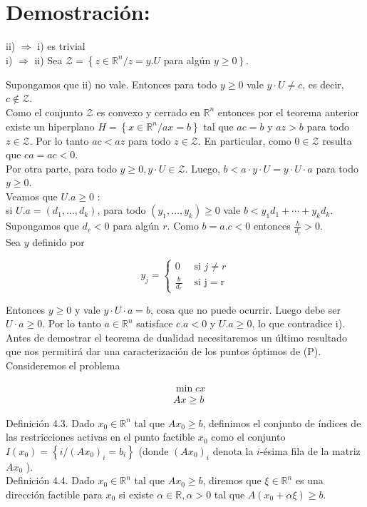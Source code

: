 \documentclass[10pt]{article}
\begin{document}
\section*{Demostración:}
ii) $\Longrightarrow$ i) es trivial\\
i) $\Longrightarrow$ ii) Sea $\mathcal{Z}=\left\{z \in \mathbb{R}^{n} / z=y . U\right.$ para algún $\left.y \geq 0\right\}$.

Supongamos que ii) no vale. Entonces para todo $y \geq 0$ vale $y \cdot U \neq c$, es decir, $c \notin \mathcal{Z}$.\\
Como el conjunto $\mathcal{Z}$ es convexo y cerrado en $\mathbb{R}^{n}$ entonces por el teorema anterior existe un hiperplano $H=\left\{x \in \mathbb{R}^{n} / a x=b\right\}$ tal que $a c=b$ y $a z>b$ para todo $z \in \mathcal{Z}$. Por lo tanto $a c<a z$ para todo $z \in \mathcal{Z}$. En particular, como $0 \in \mathcal{Z}$ resulta que $c a=a c<0$.\\
Por otra parte, para todo $y \geq 0, y \cdot U \in \mathcal{Z}$. Luego, $b<a \cdot y \cdot U=y \cdot U \cdot a$ para todo $y \geq 0$.\\
Veamos que $U . a \geq 0$ :\\
si $U . a=\left(d_{1}, \ldots, d_{k}\right)$, para todo $\left(y_{1}, \ldots, y_{k}\right) \geq 0$ vale $b<y_{1} d_{1}+\cdots+y_{k} d_{k}$. Supongamos que $d_{r}<0$ para algún $r$. Como $b=a . c<0$ entonces $\frac{b}{d_{r}}>0$.\\
Sea $y$ definido por

$$
y_{j}= \begin{cases}0 & \text { si } j \neq r \\ \frac{b}{d_{r}} & \text { si } \mathrm{j}=\mathrm{r}\end{cases}
$$

Entonces $y \geq 0$ y vale $y \cdot U \cdot a=b$, cosa que no puede ocurrir. Luego debe ser $U \cdot a \geq 0$. Por lo tanto $a \in \mathbb{R}^{n}$ satisface $c . a<0$ y $U . a \geq 0$, lo que contradice i).\\
Antes de demostrar el teorema de dualidad necesitaremos un último resultado que nos permitirá dar una caracterización de los puntos óptimos de (P).\\
Consideremos el problema


\begin{align*}
& \min c x \\
& A x \geq b \tag{P}
\end{align*}


Definición 4.3. Dado $x_{0} \in \mathbb{R}^{n}$ tal que $A x_{0} \geq b$, definimos el conjunto de índices de las restricciones activas en el punto factible $x_{0}$ como el conjunto $I\left(x_{0}\right)=\left\{i /\left(A x_{0}\right)_{i}=b_{i}\right\}$ (donde $\left(A x_{0}\right)_{i}$ denota la $i$-ésima fila de la matriz $A x_{0}$ ).\\
Definición 4.4. Dado $x_{0} \in \mathbb{R}^{n}$ tal que $A x_{0} \geq b$, diremos que $\xi \in \mathbb{R}^{n}$ es una dirección factible para $x_{0}$ si existe $\alpha \in \mathbb{R}, \alpha>0$ tal que $A\left(x_{0}+\alpha \xi\right) \geq b$.
\end{document}
